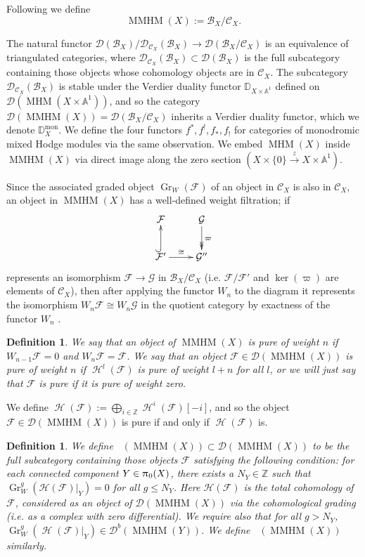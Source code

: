 \documentclass[a4paper,10pt]{amsart}
\newtheorem{definition}[theorem]{Definition}
\newcommand{\DD}{\mathbb{D}}
\renewcommand{\pi}{\uppi\hspace{0.05em}}
\DeclareMathOperator{\mon}{mon}
\DeclareMathOperator{\MMHM}{MMHM}
\DeclareMathOperator{\Gr}{Gr}
\DeclareMathOperator{\MHM}{MHM}
\DeclareMathOperator{\Ho}{\mathcal{H}}
\DeclareMathOperator{\Dulf}{\mathcal{D}^{\geq, lf}}
\DeclareMathOperator{\Dllf}{\mathcal{D}^{\leq, lf}}
\newcommand{\Db}{\mathcal{D}^{b}}
\newcommand{\Dub}{\mathcal{D}}
\begin{document}
Following \cite[Sec.7]{COHA} we define 
\[
\MMHM(X):=\mathcal{B}_X/\mathcal{C}_X.
\]

The natural functor $\Dub(\mathcal{B}_X)/\Dub_{\mathcal{C}_X}(\mathcal{B}_X)\rightarrow \Dub(\mathcal{B}_X/\mathcal{C}_X)$ is an equivalence of triangulated categories, where $\Dub_{\mathcal{C}_X}(\mathcal{B}_X)\subset \Dub(\mathcal{B}_X)$ is the full subcategory containing those objects whose cohomology objects are in $\mathcal{C}_X$.  The subcategory $\Dub_{\mathcal{C}_X}(\mathcal{B}_X)$ is stable under the Verdier duality functor $\DD_{X\times \mathbb{A}^1}$ defined on $\Dub(\MHM(X\times\mathbb{A}^1))$, and so the category $\Dub(\MMHM(X))=\Dub(\mathcal{B}_X/\mathcal{C}_X)$ inherits a Verdier duality functor, which we denote $\DD_{X}^{\mon}$.  We define the four functors $f^*,f^!,f_*,f_!$ for categories of monodromic mixed Hodge modules via the same observation.  We embed $\MHM(X)$ inside $\MMHM(X)$ via direct image along the zero section $(X\times\{0\}\xrightarrow{z} X\times\mathbb{A}^1)$.

Since the associated graded object $\Gr_W(\mathcal{F})$ of an object in $\mathcal{C}_X$ is also in $\mathcal{C}_X$, an object in $\MMHM(X)$ has a well-defined weight filtration; if
\[
\xymatrix{
\mathcal{F}&\mathcal{G}\ar@{->>}[d]^{\varpi}\\
\mathcal{F}'\ar@{^(->}[u]\ar[r]^{\cong}&\mathcal{G}''
}
\]
represents an isomorphism $\mathcal{F}\rightarrow \mathcal{G}$ in $\mathcal{B}_X/\mathcal{C}_X$ (i.e. $\mathcal{F}/\mathcal{F}'$ and $\ker(\varpi)$ are elements of $\mathcal{C}_X$), then after applying the functor $W_n$ to the diagram it represents the isomorphism $W_n\mathcal{F}\cong W_n\mathcal{G}$ in the quotient category by exactness of the functor $W_n$ \cite[5.1.14]{Sa88}.

\begin{definition}
We say that an object of $\MMHM(X)$ is pure of weight $n$ if $W_{n-1}\mathcal{F}=0$ and $W_{n}\mathcal{F}=\mathcal{F}$.  We say that an object $\mathcal{F}\in\Dub(\MMHM(X))$ is pure of weight $n$ if $\Ho^l(\mathcal{F})$ is pure of weight $l+n$ for all $l$, or we will just say that $\mathcal{F}$ is \textit{pure} if it is pure of weight zero.
\end{definition}
We define $\Ho(\mathcal{F}):=\bigoplus_{i\in\mathbb{Z}}\Ho^i(\mathcal{F})[-i]$, and so the object $\mathcal{F}\in\Dub(\MMHM(X))$ is pure if and only if $\Ho(\mathcal{F})$ is.
\begin{definition}
We define $\Dulf(\MMHM(X))\subset \Dub(\MMHM(X))$ to be the full subcategory containing those objects $\mathcal{F}$ satisfying the following condition: for each connected component $Y\in\pi_0(X)$, there exists a $N_Y\in\mathbb{Z}$ such that $\Gr_W^g(\mathcal{H}(\mathcal{F})|_Y)=0$ for all $g\leq N_Y$.  Here $\mathcal{H}(\mathcal{F})$ is the total cohomology of $\mathcal{F}$, considered as an object of $\Dub(\MMHM(X))$ via the cohomological grading (i.e. as a complex with zero differential).  We require also that for all $g>N_Y$, $\Gr_W^{g}(\Ho(\mathcal{F})|_Y)\in\Db(\MMHM(Y))$.  We define $\Dllf(\MMHM(X))$ similarly.  
\end{definition}
\end{document}
